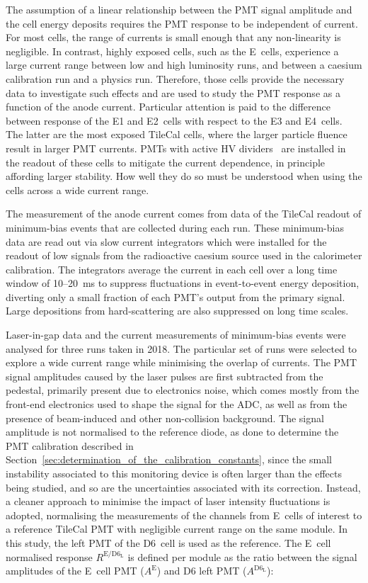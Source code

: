 The assumption of a linear relationship between the PMT signal amplitude and the cell energy deposits requires the PMT response to be independent of current. For most cells, the range of currents is small enough that any non-linearity is negligible. In contrast, highly exposed cells, such as the E~cells, experience a large current range between low and high luminosity runs, and between a caesium calibration run and a physics run. Therefore, those cells provide the necessary data to investigate such effects and are used to study the PMT response as a function of the anode current. Particular attention is paid to the difference between response of the E1 and E2~cells with respect to the E3 and E4~cells. The latter are the most exposed TileCal cells, where the larger particle fluence result in larger PMT currents. PMTs with active HV dividers~\cite{ATLAS-TDR-28} are installed in the readout of these cells to mitigate the current dependence, in principle affording larger stability. How well they do so must be understood when using the cells across a wide current range.

The measurement of the anode current comes from data of the TileCal readout of minimum-bias events that are collected during each run.
These minimum-bias data are read out via slow current integrators which were installed for the readout of low signals from the radioactive caesium source used in the calorimeter calibration. The integrators average the current in each cell over a long time window of 10--20~ms to suppress fluctuations in event-to-event energy deposition, diverting only a small fraction of each PMT's output from the primary signal. Large depositions from hard-scattering are also suppressed on long time scales.

Laser-in-gap data and the current measurements of minimum-bias events were analysed for three runs taken in 2018. The particular set of runs were selected to explore a wide current range while minimising the overlap of currents. The PMT signal amplitudes caused by the laser pulses are first subtracted from the pedestal, primarily present due to electronics noise, which comes mostly from the front-end electronics used to shape the signal for the ADC, as well as from the presence of beam-induced and other non-collision background. The signal amplitude is not normalised to the reference diode, as done to determine the PMT calibration described in Section~\ref{sec:determination_of_the_calibration_constants}, since the small instability associated to this monitoring device is often larger than the effects being studied, and so are the uncertainties associated with its correction. Instead, a cleaner approach to minimise the impact of laser intensity fluctuations is adopted, normalising the measurements of the channels from E~cells of interest to a reference TileCal PMT with negligible current range on the same module. In this study, the left PMT of the D6~cell is used as the reference. The E~cell normalised response $R^{\mathrm{E/D6_L}}$ is defined per module as the ratio between the signal amplitudes of the E~cell PMT ($A^\mathrm{E}$) and D6 left PMT ($A^{\mathrm{D6_L}}$):

